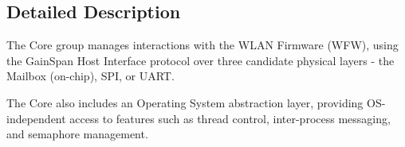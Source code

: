 \subsection{Detailed Description}
The Core group manages interactions with the WLAN Firmware (WFW), using the GainSpan Host Interface protocol over three candidate physical layers -\/ the Mailbox (on-\/chip), SPI, or UART. \par
 \par


The Core also includes an Operating System abstraction layer, providing OS-\/independent access to features such as thread control, inter-\/process messaging, and semaphore management. 